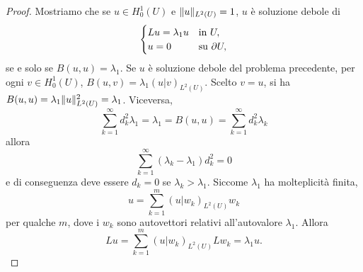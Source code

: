 \begin{proof}
	Mostriamo che se $u \in H^1_0(U)$ e $\lVert u\rVert_{L^2(U)}=1$, $u$ è soluzione debole di 
	\[ \begin{cases}
		Lu = \lambda_1 u & \textup{in } U,\\
		u = 0 & \textup{su } \partial U,
	\end{cases} \]
	se e solo se $B(u,u) = \lambda_1$. Se $u$ è soluzione debole del problema precedente, per ogni $v \in H^1_0(U)$, $B(u,v) = \lambda_1 (u|v)_{L^2(U)}$. Scelto $v= u$, si ha $B(u,u) = \lambda_1 \lVert u\rVert^2_{L^2(U)} = \lambda_1$. Viceversa,
	\[ \sum_{k=1}^\infty d^2_k \lambda_1 = \lambda_1 = B(u,u) = \sum_{k=1}^{\infty} d_k^2 \lambda_k \]
	allora
	\[ \sum_{k=1}^{\infty} (\lambda_k - \lambda_1) d_k^2 = 0 \]
	e di conseguenza deve essere $d_k = 0$ se $\lambda_k > \lambda_1$. Siccome $\lambda_1$ ha molteplicità finita, 
	\[ u = \sum_{k=1}^{m} (u|w_k)_{L^2(U)} w_k \]
	per qualche $m$, dove i $w_k$ sono autovettori relativi all'autovalore $\lambda_1$. Allora
	\[ Lu = \sum_{k=1}^{m} (u|w_k)_{L^2(U)} Lw_k = \lambda_1 u. \] 
	

\end{proof}
